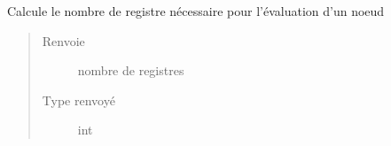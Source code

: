 \documentclass[letterpaper,10pt,french]{sphinxmanual}
\begin{document}
\begin{fulllineitems}
\begin{fulllineitems}
\begin{quote}
\begin{description}
\end{description}\end{quote}

\end{fulllineitems}


\begin{fulllineitems}
\label{\detokenize{arithmeticexpressionnodes:arithmeticexpressionnodes.ArithmeticExpressionNode.getRegisterCost}}
Calcule le nombre de registre nécessaire pour l’évaluation d’un noeud
\begin{quote}\begin{description}
\item[{Renvoie}] \leavevmode
nombre de registres

\item[{Type renvoyé}] \leavevmode
int

\end{description}\end{quote}

\end{fulllineitems}


\end{fulllineitems}

\end{document}

